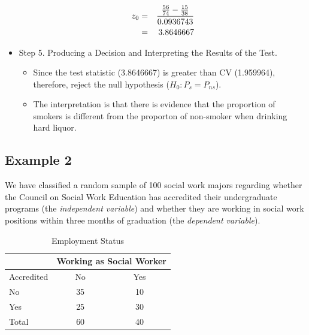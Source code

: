 \documentclass[11pt, chapterprefix=true]{scrbook}\usepackage[]{graphicx}\usepackage[]{color}
\begin{document}
\begin{itemize}
    \begin{eqnarray*}
    z_0 &=& \frac{\frac{56}{74} - \frac{15}{38}}{0.0936743} \\ \vspace{3mm}
        &=& 3.8646667
    \end{eqnarray*}

\item Step 5.  Producing a Decision and Interpreting the Results of the Test.
	\begin{itemize}
	\samepage
	\item Since the test statistic (3.8646667) is greater than CV (1.959964), therefore, reject the null hypothesis ($H_0: P_s = P_{ns}$).
	\samepage
	\item The interpretation is that there is evidence that the proportion of smokers is different from the proporton of non-smoker when drinking hard liquor.
	\end{itemize}
	 
\end{itemize}

\subsection{Example 2}    %

We have classified a random sample of 100 social work majors regarding whether the Council on Social Work Education has accredited their undergraduate programs (the \emph{independent variable}) and whether they are working in social work positions within three months of graduation (the \emph{dependent variable}).



\begin{table}[htbp]
   \centering
   \caption{Employment Status}
   \begin{tabular}{@{} lcc @{}} \hline %
     &  \multicolumn{2}{c}{ Working as Social Worker } \\ \hline
     Accredited   & No & Yes \\ \hline
     No           & 35 & 10 \\
     Yes          & 25 & 30 \\ \hline
     Total        & 60 & 40 \\ \hline
   \end{tabular}
   
   \label{tab:c10_2}
\end{table}
\end{document}
